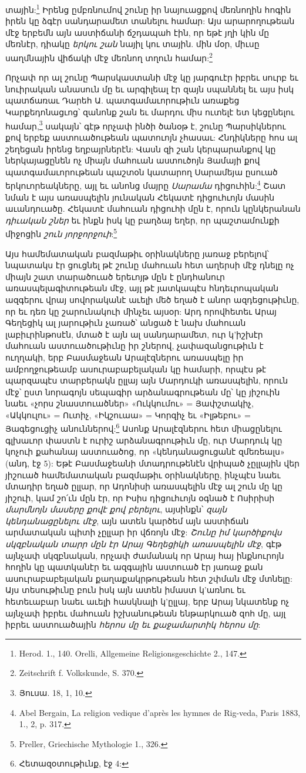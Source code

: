 \documentclass{article}
\begin{document}
{տային:\footnote{Herod. 1., 140. Orelli, Allgemeine Religionsgeschichte 2., 147.} Իրենց ըմբռնումով շունը իր նայուացքով մեռնողին հոգին իրեն կը ձգէր սանդարամետ տանելու համար: Այս արարողութեան մէջ երբեմն այն աստիճանի ճշդապահ էին, որ եթէ յղի կին մը մեռնէր, դիակը \emph{երկու շան} նայիլ կու տային. մին մօր, միւսը սաղմնային վիճակի մէջ մեռնող տղուն համար:\footnote{Zeitschrift f. Volkskunde, S. 370.}

Որչափ որ ալ շունը Պարսկաստանի մէջ կը յարգուէր իբրեւ սուրբ եւ նուիրական անասուն մը եւ արգիլեալ էր զայն սպաննել եւ այս իսկ պատճառաւ Դարեհ Ա. պատգամաւորութիւն առաքեց Կարքեդոնացւոց՝ զանոնք շան եւ մարդու միս ուտելէ ետ կեցընելու համար,\footnote{Յուսա. 18, 1, 10.} սակայն՝ գէթ որչափ ինծի ծանօթ է, շունը Պարսիկներու քով երբեք աստուածութեան պատուոյն չհասաւ: Հնդիկները հոս ալ շեղեցան իրենց եղբայրներէն: Վասն զի շան կերպարանքով կը ներկայացընեն ոչ միայն մահուան աստուծոյն Յամայի քով պատգամաւորութեան պաշտօն կատարող Սարամեյա ըսուած երկուորեակները, այլ եւ անոնց մայրը \emph{Սարամա} դիցուհին:\footnote{Abel Bergain, La religion vedique d'après les hymnes de Rig-veda, Paris 1883, 1., 2, p. 317.} Շատ նման է այս առասպելին յունական Հեկատէ դիցուհւոյն մասին աւանդուածը. Հեկատէ մահուան դիցուհի մըն է, որուն կընկերանան \emph{դիւական շներ} եւ ինքն իսկ կը բաղձայ եղեր, որ պաշտամունքի միջոցին \emph{շուն յորջորջուի}:\footnote{Preller, Griechische Mythologie 1., 326.}

Այս համեմատական բազմաթիւ օրինակները յառաջ բերելով՝ նպատակս էր ցուցնել թէ շունը մահուան հետ աղերսի մէջ դնելը ոչ միայն շատ տարածուած երեւոյթ մըն է ընդհանուր առասպելագիտութեան մէջ, այլ թէ յատկապէս հնդեւրոպական ազգերու վրայ սովորականէ աւելի մեծ եղած է անոր ազդեցութիւնը, որ եւ դեռ կը շարունակուի մինչեւ այսօր: Արդ որովհետեւ Արայ Գեղեցիկ ալ յարութիւն չառած՝ անցած է նախ մահուան լաբիւրինթոսէն, մտած է այն ալ սանդարամետ, ուր կ'իշխէր մահուան աստուածութիւնը իր շներով, չափազանցութիւն է ուղղակի, երբ Բասմաջեան Արալէզներու առասպելը իր ամբողջութեամբ ասուրաբաբելական կը համարի, որպէս թէ պարզապէս տարբերակն ըլլայ այն Մարդուկի առասպելին, որուն մէջ՝ ըստ նորագոյն սեպագիր արձանագրութեան մը՝ կը յիշուին նաեւ «չորս շնաստուածներ» «Ուկկումու» = Յափշտակիչ, «Ակկուլու» = Ուտիչ, «Իկշուաա» = Կորզիչ եւ «Իլթեբու» = Յագեցուցիչ անուններով:\footnote{Հետազօտութիւնք, էջ 4:} Ասոնք Արալէզներու հետ միացընելու գլխաւոր փաստն է ուրիշ արձանագրութիւն մը, ուր Մարդուկ կը կոչուի քահանայ աստուածոց, որ «կենդանացուցանէ զմեռեալս» (անդ, էջ 5): Եթէ Բասմաջեանի մտադրութենէն վրիպած չըլլային վեր յիշուած համեմատական բազմաթիւ օրինակները, ինչպէս նաեւ մտադիր եղած ըլլար, որ Ադոնիսի առասպելին մէջ ալ շուն մը կը յիշուի, կամ շո՛ւն մըն էր, որ Իսիս դիցուհւոյն օգնած է Ոսիրիսի \emph{մարմնոյն մասերը քովէ քով բերելու}, այսինքն՝ \emph{զայն կենդանացընելու մէջ}, այն ատեն կարծեմ այն աստիճան արմատական պիտի չըլլար իր վճռոյն մէջ: \emph{Շունը իմ կարծիքովս սկզբնական տարր մըն էր Արայ Գեղեցիկի առասպելին մէջ}, գէթ այնչափ սկզբնական, որչափ ժամանակ որ Արայ հայ ինքնուրոյն հողին կը պատկանէր եւ ազգային աստուած էր յառաջ քան ասուրաբաբելական քաղաքակրթութեան հետ շփման մէջ մտնելը: Այս տեսութիւնը բուն իսկ այն ատեն իմաստ կ'առնու եւ հետեւաբար նաեւ աւելի հասկնալի կ'ըլլայ, երբ Արայ նկատենք ոչ այնչափ իբրեւ մահուան իշխանութեան ենթարկուած զոհ մը, այլ իբրեւ աստուածային \emph{հերոս մը եւ քաջամարտիկ հերոս մը}:

}
\end{document}
